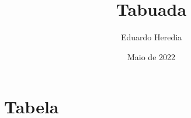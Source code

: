 \documentclass[a4paper]{article}
\title{Tabuada}
\author{Eduardo Heredia}
\date{Maio de 2022}
\begin{document}
    \maketitle

    \section{Tabela}

        
\end{document}
